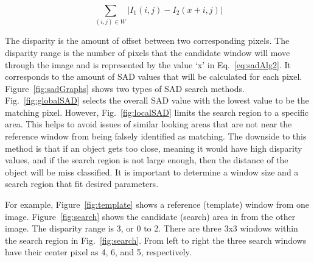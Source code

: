 \begin{equation}
	\sum\limits_{(i,j)\in W}\left| I_{1}(i,j)-I_{2}(x+i,j) \right|
	\label{eq:sadAlg2}
\end{equation}

The disparity is the amount of offset between two corresponding pixels. The disparity range is the number of pixels that the candidate window will move through the image and is represented by the value `x' in Eq.~\ref{eq:sadAlg2}. It corresponds to the amount of SAD values that will be calculated for each pixel. Figure~\ref{fig:sadGraphs} shows two types of SAD search methods. Fig.~\ref{fig:globalSAD} selects the overall SAD value with the lowest value to be the matching pixel. However, Fig.~\ref{fig:localSAD} limits the search region to a specific area. This helps to avoid issues of similar looking areas that are not near the reference window from being falsely identified as matching. The downside to this method is that if an object gets too close, meaning it would have high disparity values, and if the search region is not large enough, then the distance of the object will be miss classified. It is important to determine a window size and a search region that fit desired parameters.

For example, Figure~\ref{fig:template} shows a reference (template) window from one image.  Figure~\ref{fig:search} shows the candidate (search) area in from the other image. The disparity range is 3, or 0 to 2. There are three 3x3 windows within the search region in Fig.~\ref{fig:search}. From left to right the three search windows have their center pixel as 4, 6, and 5, respectively. 

